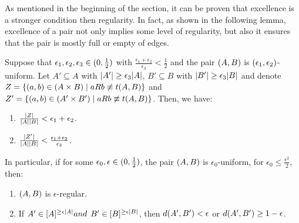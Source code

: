 
    As mentioned in the beginning of the section, it can be proven that excellence is a stronger condition then
    regularity.
    In fact, as shown in the following lemma, excellence of a pair not only implies some level of regularity, but
    also it ensures that the pair is mostly full or empty of edges.

    \begin{lemma}[Lemma 5.17] \label{lem:excellence_implies_regularity}
        Suppose that $\epsilon_1, \epsilon_2, \epsilon_3 \in ( 0, \frac{1}{2} )$ with
        $\frac{\epsilon_1 + \epsilon_2}{\epsilon_3} < \frac{1}{2}$ and the pair $( A,B )$ is
        $( \epsilon_1, \epsilon_2 )$-uniform.
        Let $A' \subseteq A$ with $| A' | \geq \epsilon_3 | A |$,
        $B' \subseteq B$ with $| B' | \geq \epsilon_3 | B |$ and
        denote $Z = \{ ( a,b ) \in ( A \times B ) \mid a R b \not\equiv t( A,B ) \}$ and
        $Z' = \{ ( a,b ) \in ( A' \times B' ) \mid a R b \not\equiv t( A,B ) \}$.
        Then, we have:
        \begin{enumerate}
            \item \label{itm:excellence_implies_regularity.1} $\frac{| Z |}{{| A | | B |}} < \epsilon_1 + \epsilon_2$.
            \item \label{itm:excellence_implies_regularity.2} $\frac{| Z' |}{| A | | B |} <
                \frac{\epsilon_1 + \epsilon_2}{\epsilon_3}$.
        \end{enumerate}
        In particular, if for some $\epsilon_0, \epsilon \in ( 0, \frac{1}{2} )$, the pair
        $( A,B )$ is $\epsilon_0$-uniform, for $\epsilon_0 \leq \frac{\epsilon^2}{2}$, then:
        \begin{enumerate}[label=\alph*., ref=\alph*]
            \item \label{itm:excellence_implies_regularity.a} $( A,B )$ is $\epsilon$-regular.
            \item \label{itm:excellence_implies_regularity.b} If $A' \in [ A ]^{\geq \epsilon | A |} and $
                $B' \in [ B ]^{\geq \epsilon | B |}$, then $d ( A',B' ) < \epsilon$ or
                $d ( A',B' ) \geq 1 - \epsilon$.
        \end{enumerate}

\end{lemma}
